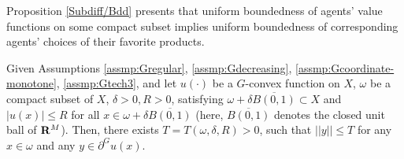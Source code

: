 Proposition \ref{Subdiff/Bdd} presents that uniform boundedness of agents' value functions on some compact subset implies uniform boundedness of corresponding agents' choices of their favorite products.\medskip

\begin{proposition}\label{Subdiff/Bdd}
	Given Assumptions \ref{assmp:Gregular}, \ref{assmp:Gdecreasing}, \ref{assmp:Gcoordinate-monotone}, \ref{assmp:Gtech3}, and let $u(\cdot)$ be a $G$-convex function on $X$, $\omega$ be a compact subset of $X$, $\delta>0, R>0$, satisfying $\omega+\delta\overline{B(0,1)}\subset X$ and $|u(x)|\le R$ for all $x\in \omega + \delta \overline{B(0,1)}$ (here, $\overline{B(0,1)}$ denotes the closed unit ball of ${\mathbf R}^M$). Then, there exists $T = T(\omega,\delta, R) > 0$, such that $||y||\le T$ for any $x \in \omega$ and any $y\in \partial^Gu(x)$.
\end{proposition}

